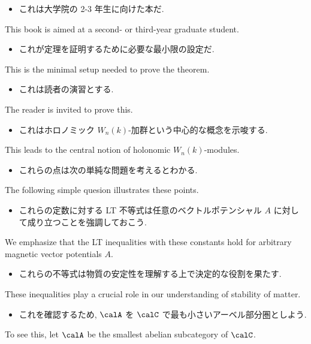 \documentclass[openany, a4paper, oneside]{jsbook}
\begin{document}
\begin{itemize}
\item これは大学院の 2-3 年生に向けた本だ. \cite{CharlesWeibel1}
\end{itemize}
This book is aimed at a second- or third-year graduate student.

\begin{itemize}
\item これが定理を証明するために必要な最小限の設定だ. \cite{OmriSarig1}
\end{itemize}
This is the minimal setup needed to prove the theorem.

\begin{itemize}
\item これは読者の演習とする. \cite{LiebSeiringer1}
\end{itemize}
The reader is invited to prove this.

\begin{itemize}
\item これはホロノミック $W_n(k)$-加群という中心的な概念を示唆する.
\end{itemize}
This leads to the central notion of holonomic $W_n(k)$-modules.

\begin{itemize}
\item これらの点は次の単純な問題を考えるとわかる. \cite{CharlesWeibel1}
\end{itemize}
The following simple quesion illustrates these points.

\begin{itemize}
\item これらの定数に対する LT 不等式は任意のベクトルポテンシャル $A$ に対して成り立つことを強調しておこう. \cite{LiebSeiringer1}
\end{itemize}
We emphasize that the LT inequalities with these constants hold for arbitrary magnetic vector potentials $A$.

\begin{itemize}
\item これらの不等式は物質の安定性を理解する上で決定的な役割を果たす. \cite{LiebSeiringer1}
\end{itemize}
These inequalities play a crucial role in our understanding of stability of matter.

\begin{itemize}
\item これを確認するため, $\calA$ を $\calC$ で最も小さいアーベル部分圏としよう.
\end{itemize}
To see this, let $\calA$ be the smallest abelian subcategory of $\calC$.
\end{document}

